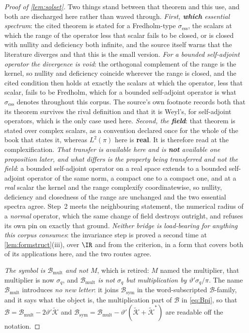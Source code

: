 \begin{proof}[Proof of \cref{lem:solset}]
Two things stand between that theorem and this use, and both are discharged here rather than waved
through. \emph{First, \textbf{which} essential spectrum}: the cited theorem is stated for a
Fredholm-type $\sigma_{\mathrm{ess}}$, the scalars at which the range of the operator less that scalar
fails to be closed, or is closed with nullity and deficiency both infinite, and the source itself
warns that the literature diverges and that this is the small version. \emph{For a bounded self-adjoint
operator the divergence is void}: the orthogonal complement of the range is the kernel, so nullity and
deficiency coincide wherever the range is closed, and the cited condition then holds at exactly the
scalars at which the operator, less that scalar, fails to be Fredholm, which for a bounded
self-adjoint operator is what $\sigma_{\mathrm{ess}}$ denotes throughout this corpus. The source's own
footnote records both that its theorem survives the rival definition and that it is Weyl's, for
self-adjoint operators, which is the only case used here.
\emph{Second, the \textbf{field}}: that theorem is stated over complex scalars, as a convention declared
once for the whole of the book that states it, whereas $L^{2}(\pi)$ here is \textbf{real}. It is
therefore read at the complexification. \emph{That transfer is available here and is \textbf{not}
available one proposition later, and what differs is the property being transferred and not the field}:
a bounded self-adjoint operator on a real space extends to a
bounded self-adjoint operator of the same norm, a compact one to a compact one, and at a \emph{real}
scalar the kernel and the range complexify coordinatewise, so nullity, deficiency and closedness of
the range are unchanged and the two essential spectra agree.  Step~2 meets the
neighbouring statement, the numerical radius of a \emph{normal} operator, which the same change of field
destroys outright, and refuses its own pin on exactly that ground. \emph{Neither bridge is load-bearing
for anything this corpus consumes}: the invariance step is proved a second time at
\cref{lem:formstruct}\textup{(iii)}, over $\IR$ and from the criterion, in a form that covers both of its
applications here, and the two routes agree.

\emph{The symbol is $\mathcal B_{\mathrm{mult}}$ and not $M$}, which is retired: $M$ named the
multiplier, that multiplier is now $\sigma_q$, and \emph{$\mathcal B_{\mathrm{mult}}$ is not $\sigma_q$
but multiplication by $\vartheta'\sigma_q/\pi$}. The name
$\mathcal B_{\mathrm{mult}}$ introduces \emph{no new letter}: it joins $\mathcal B_{\mathrm{sym}}$ in the
word-subscripted $\mathcal B$-family, and it says what the object is, the multiplication part of
$\mathcal B$ in \eqref{eq:Bpi}, so that
$\mathcal B=\mathcal B_{\mathrm{mult}}-2\vartheta'\tilde{\mathcal K}$ and
$\mathcal B_{\mathrm{sym}}=\mathcal B_{\mathrm{mult}}-\vartheta'(\tilde{\mathcal K}+\tilde{\mathcal K}^\ast)$
are readable off the notation.


\end{proof}
